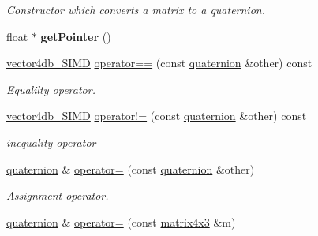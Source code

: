 \begin{DoxyCompactItemize}
\begin{DoxyCompactList}\small\item\em Constructor which converts a matrix to a quaternion. \end{DoxyCompactList}\item 
float $\ast$ {\bfseries get\+Pointer} ()\hypertarget{classirr_1_1core_1_1quaternion_a9ef50eb59852286a2d96ed0fa7932b3f}{}\label{classirr_1_1core_1_1quaternion_a9ef50eb59852286a2d96ed0fa7932b3f}

\item 
\hyperlink{classirr_1_1core_1_1vectorSIMDBool}{vector4db\+\_\+\+S\+I\+MD} \hyperlink{classirr_1_1core_1_1quaternion_a70ac83a6c647a79915c13382b4a0d3be}{operator==} (const \hyperlink{classirr_1_1core_1_1quaternion}{quaternion} \&other) const \hypertarget{classirr_1_1core_1_1quaternion_a70ac83a6c647a79915c13382b4a0d3be}{}\label{classirr_1_1core_1_1quaternion_a70ac83a6c647a79915c13382b4a0d3be}

\begin{DoxyCompactList}\small\item\em Equalilty operator. \end{DoxyCompactList}\item 
\hyperlink{classirr_1_1core_1_1vectorSIMDBool}{vector4db\+\_\+\+S\+I\+MD} \hyperlink{classirr_1_1core_1_1quaternion_a72a48bb4e4d1d158ca73a01344181ff7}{operator!=} (const \hyperlink{classirr_1_1core_1_1quaternion}{quaternion} \&other) const \hypertarget{classirr_1_1core_1_1quaternion_a72a48bb4e4d1d158ca73a01344181ff7}{}\label{classirr_1_1core_1_1quaternion_a72a48bb4e4d1d158ca73a01344181ff7}

\begin{DoxyCompactList}\small\item\em inequality operator \end{DoxyCompactList}\item 
\hyperlink{classirr_1_1core_1_1quaternion}{quaternion} \& \hyperlink{classirr_1_1core_1_1quaternion_ac985b164e0b1e3403fdd7352bd9de8c5}{operator=} (const \hyperlink{classirr_1_1core_1_1quaternion}{quaternion} \&other)\hypertarget{classirr_1_1core_1_1quaternion_ac985b164e0b1e3403fdd7352bd9de8c5}{}\label{classirr_1_1core_1_1quaternion_ac985b164e0b1e3403fdd7352bd9de8c5}

\begin{DoxyCompactList}\small\item\em Assignment operator. \end{DoxyCompactList}\item 
\hyperlink{classirr_1_1core_1_1quaternion}{quaternion} \& \hyperlink{classirr_1_1core_1_1quaternion_a9a4a0a63e255104415d386f4bdeee4bc}{operator=} (const \hyperlink{classirr_1_1core_1_1matrix4x3}{matrix4x3} \&m)\hypertarget{classirr_1_1core_1_1quaternion_a9a4a0a63e255104415d386f4bdeee4bc}{}\label{classirr_1_1core_1_1quaternion_a9a4a0a63e255104415d386f4bdeee4bc}


\end{DoxyCompactItemize}
